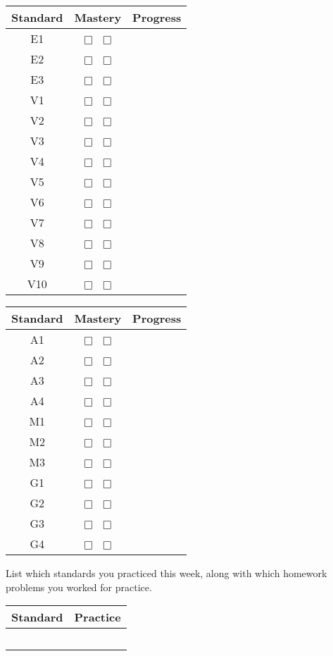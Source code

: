 \documentclass[letterpaper]{article}
\newcommand{\boxes}{\(\Box\) \(\Box\)}
\begin{document}
\hfill
\begin{tabular}{|c|c|c|} \hline
Standard & Mastery & Progress \\ \hline
E1 & \boxes &   \\  \hline
E2 & \boxes &   \\  \hline
E3 & \boxes &   \\  \hline
V1 & \boxes &   \\  \hline
V2 & \boxes &   \\  \hline
V3 & \boxes &  \\  \hline
V4 & \boxes & \\  \hline
V5 & \boxes &  \\  \hline
V6 & \boxes &  \\  \hline
V7 & \boxes &  \\  \hline
V8 & \boxes &  \\  \hline
V9 & \boxes &  \\  \hline
V10 & \boxes & \\  \hline
\end{tabular}
\hfill
\begin{tabular}{|c|c|c|} \hline
Standard & Mastery & Progress \\ \hline
A1& \boxes & \\  \hline
A2 & \boxes &  \\  \hline
A3 & \boxes &  \\  \hline
A4 & \boxes &  \\  \hline
M1 & \boxes &  \\  \hline
M2 & \boxes &  \\  \hline
M3 & \boxes &  \\  \hline
G1 & \boxes &  \\  \hline
G2 & \boxes &  \\  \hline
G3 & \boxes &  \\  \hline
G4 & \boxes &  \\  \hline
\end{tabular}
\hfill
\hfill

\vspace{0.3in}
List which standards you practiced this week, along with which homework problems you worked for practice. \\
\setlength{\extrarowheight}{15pt}
\begin{center}
\begin{tabular}{|c|p{3in}|}\hline
Standard & Practice \\ \hline
& \\ \hline
& \\ \hline
& \\ \hline
& \\ \hline
& \\ \hline
\end{tabular}
\end{center}
  
\end{document}
